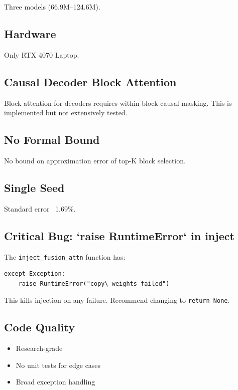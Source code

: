 Three models (66.9M--124.6M).

\subsection{Hardware}

Only RTX 4070 Laptop.

\subsection{Causal Decoder Block Attention}

Block attention for decoders requires within-block causal masking. This is 
implemented but not extensively tested.

\subsection{No Formal Bound}

No bound on approximation error of top-K block selection.

\subsection{Single Seed}

Standard error ~1.69\%.

\subsection{Critical Bug: `raise RuntimeError` in inject}

The \texttt{inject\_fusion\_attn} function has:

\begin{lstlisting}
except Exception:
    raise RuntimeError("copy\_weights failed")
\end{lstlisting}

This kills injection on any failure. Recommend changing to \texttt{return None}.

\subsection{Code Quality}

\begin{itemize}
\item Research-grade
\item No unit tests for edge cases
\item Broad exception handling

\end{itemize}
